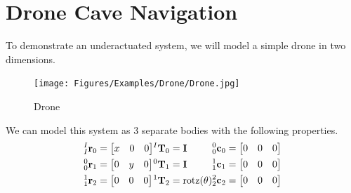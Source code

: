 \section{Drone Cave Navigation}  \label{sec:drone}

\noindent To demonstrate an underactuated system, we will model a simple drone in two dimensions.

\begin{figure}[H]
    \centering
    \texttt{[image: Figures/Examples/Drone/Drone.jpg]}
    \caption{Drone}
    \label{fig:drone}
\end{figure}
\noindent We can model this system as 3 separate bodies with the following properties.
\begin{align*}
    \begin{split}
        {^I_I \mathbf{r}_0} &= \begin{bmatrix} x & 0 & 0\end{bmatrix} \\
        {^0_0 \mathbf{r} _1} &= \begin{bmatrix} 0 & y & 0 \end{bmatrix} \\ 
        {^1_1 \mathbf{r} _2} &= \begin{bmatrix} 0& 0& 0 \end{bmatrix}\\
    \end{split}
    \begin{split}
        {^I \mathbf{T}_0} &= {\mathbf{I}}\\
        {^0 \mathbf{T}_1} &= {\mathbf{I}}\\
        {^1 \mathbf{T}_2} &= \text{rotz}(\theta)\\
    \end{split}
    \begin{split}
    \end{split}
    \begin{split}
        {^0_0 \mathbf{c}_0} &= \begin{bmatrix} 0& 0& 0 \end{bmatrix}\\
        {^1_1 \mathbf{c} _1} &= \begin{bmatrix} 0& 0& 0 \end{bmatrix}\\
        {^2_2 \mathbf{c} _2} &= \begin{bmatrix} 0& 0& 0 \end{bmatrix}\\
    \end{split}
\end{align*}
